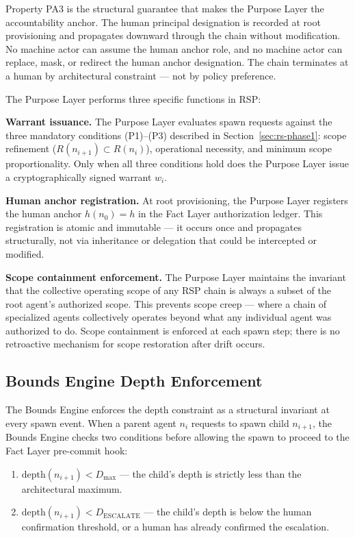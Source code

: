 Property PA3 is the structural guarantee that makes the Purpose Layer the accountability anchor. The human principal designation is recorded at root provisioning and propagates downward through the chain without modification. No machine actor can assume the human anchor role, and no machine actor can replace, mask, or redirect the human anchor designation. The chain terminates at a human by architectural constraint — not by policy preference.

The Purpose Layer performs three specific functions in RSP:

\medskip
\noindent\textbf{Warrant issuance.} The Purpose Layer evaluates spawn requests against the three mandatory conditions (P1)–(P3) described in Section~\ref{sec:rs-phase1}: scope refinement ($R(n_{i+1}) \subset R(n_i)$), operational necessity, and minimum scope proportionality. Only when all three conditions hold does the Purpose Layer issue a cryptographically signed warrant $w_i$.

\medskip
\noindent\textbf{Human anchor registration.} At root provisioning, the Purpose Layer registers the human anchor $h(n_0) = h$ in the Fact Layer authorization ledger. This registration is atomic and immutable — it occurs once and propagates structurally, not via inheritance or delegation that could be intercepted or modified.

\medskip
\noindent\textbf{Scope containment enforcement.} The Purpose Layer maintains the invariant that the collective operating scope of any RSP chain is always a subset of the root agent's authorized scope. This prevents scope creep — where a chain of specialized agents collectively operates beyond what any individual agent was authorized to do. Scope containment is enforced at each spawn step; there is no retroactive mechanism for scope restoration after drift occurs.

\subsection{Bounds Engine Depth Enforcement}
\label{sec:rs-bounds-engine}

The Bounds Engine enforces the depth constraint as a structural invariant at every spawn event. When a parent agent $n_i$ requests to spawn child $n_{i+1}$, the Bounds Engine checks two conditions before allowing the spawn to proceed to the Fact Layer pre-commit hook:

\begin{enumerate}
    \item[(BC1)] $\text{depth}(n_{i+1}) < D_{\max}$ — the child's depth is strictly less than the architectural maximum.
    \item[(BC2)] $\text{depth}(n_{i+1}) < D_{\text{ESCALATE}}$ — the child's depth is below the human confirmation threshold, or a human has already confirmed the escalation.
\end{enumerate}

